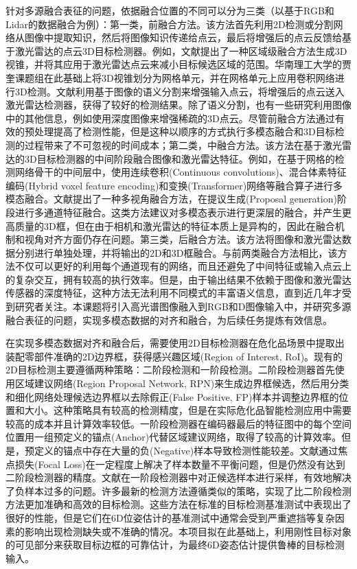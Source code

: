 \documentclass[12pt]{article}
\begin{document}
针对多源融合表征的问题，依据融合位置的不同可以分为三类（以基于RGB和Lidar的数据融合为例）：第一类，前融合方法。该方法首先利用2D检测或分割网络从图像中提取知识，然后将图像知识传递给点云，最后将增强后的点云反馈给基于激光雷达的点云3D目标检测器。例如，文献\cite{Qi2018}提出了一种区域级融合方法生成3D视锥，并将其应用于激光雷达点云来减小目标候选区域的范围。华南理工大学的贾奎课题组在此基础上将3D视锥划分为网格单元，并在网格单元上应用卷积网络进行3D检测\cite{Wang2019}。文献\cite{Vora2020}利用基于图像的语义分割来增强输入点云，将增强后的点云送入激光雷达检测器，获得了较好的检测结果。除了语义分割，也有一些研究利用图像中的其他信息，例如使用深度图像来增强稀疏的3D点云\cite{Yin2021}。尽管前融合方法通过有效的预处理提高了检测性能，但是这种以顺序的方式执行多模态融合和3D目标检测的过程带来了不可忽视的时间成本；第二类，中融合方法。该方法在基于激光雷达的3D目标检测器的中间阶段融合图像和激光雷达特征。例如，在基于网格的检测网络骨干的中间层中，使用连续卷积(Continuous convolutions)\cite{Liang2018,Liang2019}、混合体素特征编码(Hybrid voxel feature encoding)\cite{Sindagi2019}和变换(Transformer)\cite{Zhang2022}网络等融合算子进行多模态融合。文献\cite{Chen2017}提出了一种多视角融合方法，在提议生成(Proposal generation)阶段进行多通道特征融合。这类方法建议对多模态表示进行更深层的融合，并产生更高质量的3D框，但在由于相机和激光雷达的特征本质上是异构的，因此在融合机制和视角对齐方面仍存在问题。第三类，后融合方法。该方法将图像和激光雷达数据分别进行单独处理，并将输出的2D和3D框融合\cite{Asvadi2018}。与前两类融合方法相比，该方法不仅可以更好的利用每个通道现有的网络，而且还避免了中间特征或输入点云上的复杂交互，拥有较高的执行效率。但是，由于输出结果不依赖于图像和激光雷达传感器的深度特征，这种方法无法利用不同模式的丰富语义信息，直到近几年才受到研究者关注\cite{Pang2020}。本课题将引入高光谱图像融入到RGB和D图像输入中，并研究多源融合表征的问题，实现多模态数据的对齐和融合，为后续任务提炼有效信息。

在实现多模态数据对齐和融合后，需要使用2D目标检测器在危化品场景中提取出装配零部件准确的2D边界框\cite{Di2021,Cai2022,Haugaard2022}，获得感兴趣区域(Region of Interest, RoI)。现有的2D目标检测主要遵循两种策略：二阶段检测和一阶段检测。二阶段检测器首先使用区域建议网络(Region Proposal Network, RPN)来生成边界框候选，然后用分类和细化网络处理候选边界框以去除假正(False Positive, FP)样本并调整边界框的位置和大小\cite{He2020,Ren2017}。这种策略具有较高的检测精度，但是在实际危化品智能检测应用中需要较高的成本并且计算效率较低。一阶段检测器在编码器最后的特征图中的每个空间位置用一组预定义的锚点(Anchor)代替区域建议网络\cite{Redmon2016}，取得了较高的计算效率。但是，预定义的锚点中存在大量的负(Negative)样本导致检测性能较差。文献\cite{Lin2017}通过焦点损失(Focal Loss)在一定程度上解决了样本数量不平衡问题，但是仍然没有达到二阶段检测器的精度。文献\cite{Zhang2020}在一阶段检测器中对正候选样本进行采样，有效地解决了负样本过多的问题。许多最新的检测方法遵循类似的策略\cite{Tian2022,Ge2021}，实现了比二阶段检测方法更加准确和高效的目标检测。这些方法在标准的目标检测基准测试中表现出了很好的性能，但是它们在6D位姿估计的基准测试中通常会受到严重遮挡等复杂因素的影响出现检测缺失或不准确的情况。本项目拟在此基础上\cite{Tian2022,Ge2021}，利用刚性目标对象的可见部分来获取目标边框的可靠估计，为最终6D姿态估计提供鲁棒的目标检测输入。
\end{document}
